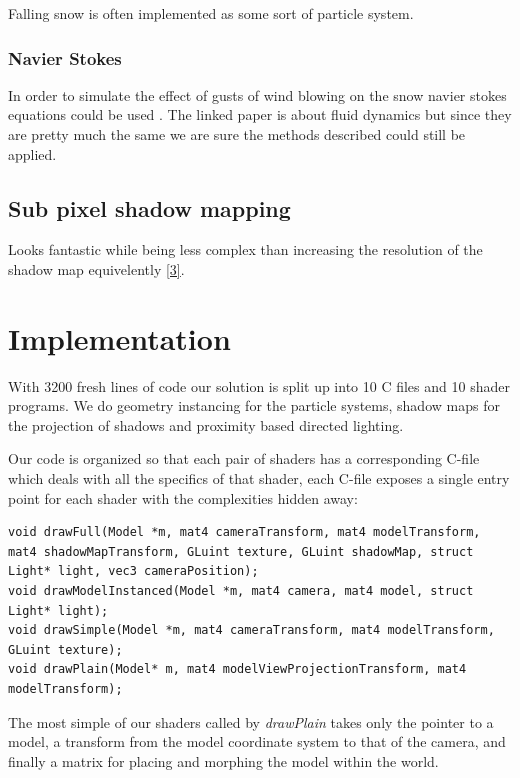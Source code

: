 \documentclass[a4paper,12pt]{article}
\begin{document}
Falling snow is often implemented as some sort of particle system.

\subsubsection{Navier Stokes}

In order to simulate the effect of gusts of wind blowing on the snow navier stokes equations could be used \cite{fluid-dynamics}. The linked paper is about fluid dynamics but since they are pretty much the same we are sure the methods described could still be applied.

\subsection{Sub pixel shadow mapping}
Looks fantastic while being less complex than increasing the resolution of the shadow map equivelently \href{https://www.youtube.com/watch?v=YSQDNy28SDM}{[3]}.


\section{Implementation}

With 3200 fresh lines of code our solution is split up into 10 C files and 10 shader programs. We do geometry instancing for the particle systems, shadow maps for the projection of shadows and proximity based directed lighting.

Our code is organized so that each pair of shaders has a corresponding C-file which deals with all the specifics of that shader, each C-file exposes a single entry point for each shader with the complexities hidden away:

\begin{lstlisting}[label=lst:entry-points,caption= The entry points of each shader pair\, listed in decreasing complexity.]
void drawFull(Model *m, mat4 cameraTransform, mat4 modelTransform, mat4 shadowMapTransform, GLuint texture, GLuint shadowMap, struct Light* light, vec3 cameraPosition);
void drawModelInstanced(Model *m, mat4 camera, mat4 model, struct Light* light);
void drawSimple(Model *m, mat4 cameraTransform, mat4 modelTransform, GLuint texture);
void drawPlain(Model* m, mat4 modelViewProjectionTransform, mat4 modelTransform);
\end{lstlisting}

The most simple of our shaders called by \emph{drawPlain} takes only the pointer to a model, a transform from the model coordinate system to that of the camera, and finally a matrix for placing and morphing the model within the world.
\end{document}

